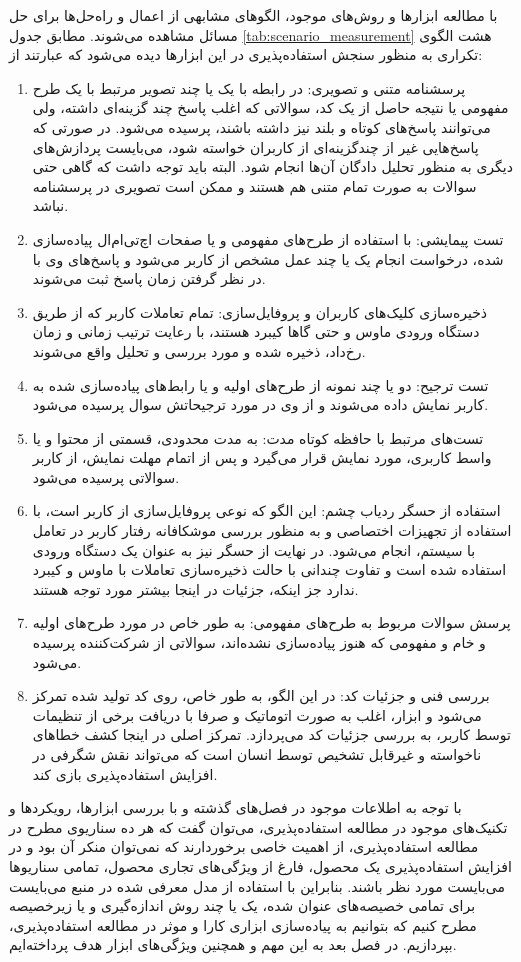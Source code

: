 با مطالعه ابزارها و روش‌های موجود، الگوهای مشابهی از اعمال و راه‌حل‌ها برای حل مسائل مشاهده می‌شوند. مطابق جدول
\ref{tab:scenario_measurement}
هشت الگوی تکراری به منظور سنجش استفاده‌پذیری در این ابزارها دیده می‌شود که عبارتند از:
\begin{enumerate}
	\item
	پرسشنامه متنی و تصویری: در رابطه با یک یا چند تصویر مرتبط با یک طرح مفهومی یا نتیجه حاصل از یک کد، سوالاتی که اغلب پاسخ چند گزینه‌ای داشته، ولی می‌توانند پاسخ‌های کوتاه و بلند نیز داشته باشند، پرسیده می‌شود. در صورتی که پاسخ‌هایی غیر از چندگزینه‌ای از کاربران خواسته شود، می‌بایست پردازش‌های دیگری به منظور تحلیل دادگان آن‌ها انجام شود. البته باید توجه داشت که گاهی حتی سوالات به صورت تمام متنی هم هستند و ممکن است تصویری در پرسشنامه نباشد.
	\item 
	تست پیمایشی: با استفاده از طرح‌های مفهومی و یا صفحات اچ‌تی‌ام‌ال پیاده‌سازی شده، درخواست انجام یک یا چند عمل مشخص از کاربر می‌شود و پاسخ‌های وی با در نظر گرفتن زمان پاسخ ثبت می‌شوند.
	\item 
	ذخیره‌سازی کلیک‌های کاربران و پروفایل‌سازی: تمام تعاملات کاربر که از طریق دستگاه ورودی ماوس و حتی گاها کیبرد هستند، با رعایت ترتیب زمانی و زمان رخ‌داد، ذخیره شده و مورد بررسی و تحلیل واقع می‌شوند.
	\item 
	تست ترجیح: دو یا چند نمونه از طرح‌های اولیه و یا رابط‌های پیاده‌سازی شده به کاربر نمایش داده می‌شوند و از وی در مورد ترجیحاتش سوال پرسیده می‌شود.
	\item 
	تست‌های مرتبط با حافظه کوتاه مدت: به مدت محدودی، قسمتی از محتوا و یا واسط کاربری، مورد نمایش قرار می‌گیرد و پس از اتمام مهلت نمایش، از کاربر سوالاتی پرسیده می‌شود.
	\item 
	استفاده از حسگر ردیاب چشم:	این الگو که نوعی پروفایل‌سازی از کاربر است، با استفاده از تجهیزات اختصاصی و به منظور بررسی موشکافانه رفتار کاربر در تعامل با سیستم، انجام می‌شود. در نهایت از حسگر نیز به عنوان یک دستگاه ورودی استفاده شده است و تفاوت چندانی با حالت ذخیره‌سازی تعاملات با ماوس و کیبرد ندارد جز اینکه، جزئیات در اینجا بیشتر مورد توجه هستند.
	\item 
	پرسش سوالات مربوط به طرح‌های مفهومی: به طور خاص در مورد طرح‌های اولیه و خام و مفهومی که هنوز پیاده‌سازی نشده‌اند، سوالاتی از شرکت‌کننده پرسیده می‌شود.
	\item 
	بررسی فنی و جزئیات کد: در این الگو، به طور خاص، روی کد تولید شده تمرکز می‌شود و ابزار، اغلب به صورت اتوماتیک و صرفا با دریافت برخی از تنظیمات توسط کاربر، به بررسی جزئیات کد می‌پردازد. تمرکز اصلی در اینجا کشف خطاهای ناخواسته و غیرقابل تشخیص توسط انسان است که می‌تواند نقش شگرفی در افزایش استفاده‌پذیری بازی کند.
\end{enumerate}
با توجه به اطلاعات موجود در فصل‌های گذشته و با بررسی ابزارها، رویکردها و تکنیک‌های موجود در مطالعه استفاده‌پذیری، می‌توان گفت که هر ده سناریوی مطرح در مطالعه استفاده‌پذیری، از اهمیت خاصی برخوردارند که نمی‌توان منکر آن بود و در افزایش استفاده‌پذیری یک محصول، فارغ از ویژگی‌های تجاری محصول، تمامی سناریوها می‌بایست مورد نظر باشند. بنابراین با استفاده از مدل معرفی شده در منبع
\cite{albert_measuring_2013}
می‌بایست برای تمامی خصیصه‌های عنوان شده، یک یا چند روش اندازه‌گیری و یا زیرخصیصه مطرح کنیم که بتوانیم به پیاده‌سازی ابزاری کارا و موثر در مطالعه استفاده‌پذیری، بپردازیم. در فصل بعد به این مهم و همچنین ویژگی‌های ابزار هدف پرداخته‌ایم.
